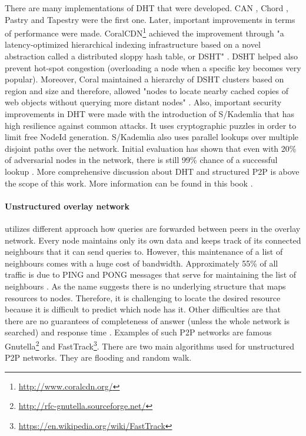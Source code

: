 There are many implementations of DHT that were developed. CAN \cite{ratnasamy_scalable_2001}, Chord \cite{stoica_chord:_2003}, Pastry \cite{rowstron_pastry:_2001} and Tapestry \cite{zhao_tapestry:_2004} were the first one. Later, important improvements in terms of performance were made. CoralCDN\footnote{\url{http://www.coralcdn.org/}} achieved the improvement through "a latency-optimized hierarchical indexing infrastructure based on a novel abstraction called a distributed sloppy hash table, or DSHT" \cite{freedman_democratizing_2004}. DSHT helped also prevent hot-spot congestion (overloading a node when a specific key becomes very popular). Moreover, Coral maintained a hierarchy of DSHT clusters based on region and size and therefore, allowed "nodes to locate nearby cached copies of web objects without querying more distant nodes" \cite{freedman_democratizing_2004}. Also, important security improvements in DHT were made with the introduction of S/Kademlia \cite{baumgart_s/kademlia:_2007} that has high resilience against common attacks. It uses cryptographic puzzles in order to limit free NodeId generation. S/Kademlia also uses parallel lookups over multiple disjoint paths over the network. Initial evaluation has shown that even with 20\% of adversarial nodes in the network, there is still 99\% chance of a successful lookup \cite{baumgart_s/kademlia:_2007}. More comprehensive discussion about DHT and structured P2P is above the scope of this work. More information can be found in this book \cite{korzun_structured_2013}.



\paragraph{Unstructured overlay network} utilizes different approach how queries are forwarded between peers in the overlay network. Every node maintains only its own data and keeps track of its connected neighbours that it can send queries to. However, this maintenance of a list of neighbours comes with a huge cost of bandwidth. Approximately 55\% of all traffic is due to PING and PONG messages that serve for maintaining the list of neighbours \cite{ripeanu_mapping_2002}. As the name suggests there is no underlying structure that maps resources to nodes. Therefore, it is challenging to locate the desired resource because it is difficult to predict which node has it. Other difficulties are that there are no guarantees of completeness of answer (unless the whole network is searched) and response time \cite{vu_peer--peer_2010}. Examples of such P2P networks are famous Gnutella\footnote{\url{http://rfc-gnutella.sourceforge.net/}} and FastTrack\footnote{\url{https://en.wikipedia.org/wiki/FastTrack}}. There are two main algorithms used for unstructured P2P networks. They are flooding and random walk.

